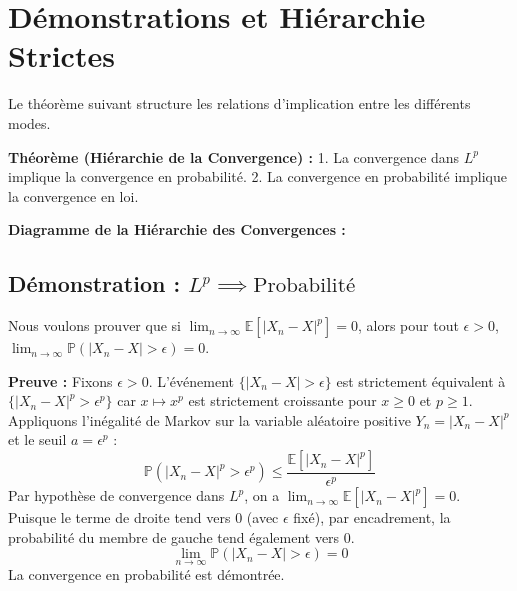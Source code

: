 \documentclass[11pt,a4paper]{article}
\begin{document}
\section{Démonstrations et Hiérarchie Strictes}

Le théorème suivant structure les relations d'implication entre les différents modes.

\textbf{Théorème (Hiérarchie de la Convergence) :}
1. La convergence dans $L^p$ implique la convergence en probabilité.
2. La convergence en probabilité implique la convergence en loi.


\textbf{Diagramme de la Hiérarchie des Convergences :}


\subsection{Démonstration : $L^p \implies \text{Probabilité}$}

Nous voulons prouver que si $\lim_{n \to \infty} \mathbb{E}[|X_n - X|^p] = 0$, alors pour tout $\epsilon > 0$, $\lim_{n \to \infty} \mathbb{P}(|X_n - X| > \epsilon) = 0$.

\textbf{Preuve :}
Fixons $\epsilon > 0$. L'événement $\{|X_n - X| > \epsilon\}$ est strictement équivalent à $\{|X_n - X|^p > \epsilon^p\}$ car $x \mapsto x^p$ est strictement croissante pour $x \ge 0$ et $p \ge 1$.
Appliquons l'inégalité de Markov sur la variable aléatoire positive $Y_n = |X_n - X|^p$ et le seuil $a = \epsilon^p$ :
$$ \mathbb{P}(|X_n - X|^p > \epsilon^p) \le \frac{\mathbb{E}[|X_n - X|^p]}{\epsilon^p} $$
Par hypothèse de convergence dans $L^p$, on a $\lim_{n \to \infty} \mathbb{E}[|X_n - X|^p] = 0$.
Puisque le terme de droite tend vers $0$ (avec $\epsilon$ fixé), par encadrement, la probabilité du membre de gauche tend également vers $0$.
$$ \lim_{n \to \infty} \mathbb{P}(|X_n - X| > \epsilon) = 0 $$
La convergence en probabilité est démontrée.
\end{document}
